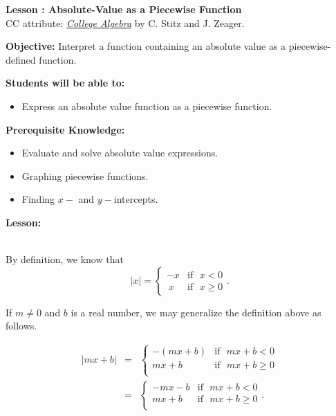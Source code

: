 \documentclass[12pt]{article}
\theoremstyle{definition}
\begin{document}
{\bf \large Lesson : Absolute-Value as a Piecewise Function}
\\ CC attribute: \href{http://www.stitz-zeager.com}{\it{College Algebra}} by C. Stitz and J. Zeager. 
\hfill \doclicenseImage[imagewidth=5em]\\
\par
{\bf Objective:} Interpret a function containing an absolute value as a piecewise-defined function.\\
\par
{\bf Students will be able to:}
\begin{itemize}
	\item Express an absolute value function as a piecewise function.
\end{itemize}
{\bf Prerequisite Knowledge:}
\begin{itemize}
	\item Evaluate and solve absolute value expressions.
	\item Graphing piecewise functions.
	\item Finding $x-$ and $y-$intercepts.
\end{itemize}
\hrulefill

{\bf Lesson:}\\
\ \par
By definition, we know that \[ |x| =  \begin{cases}
-x & \text{if~~} x < 0 \\
~x & \text{if~~} x \geq 0
\end{cases}.\] 

If $m\neq 0$ and $b$ is a real number, we may generalize the definition above as follows.

\begin{eqnarray*}
|mx+b| &=&  \begin{cases} -(mx+b)  & \text{if~~} mx+b < 0  \\
 mx+b~ & \text{if~~} mx+b \geq 0 \\ \end{cases}\\
&=&\begin{cases} -mx-b & \text{if~~} mx+b < 0  \\ mx+b & \text{if~~} mx+b \geq 0 \\ \end{cases}.
\end{eqnarray*}
\end{document}
